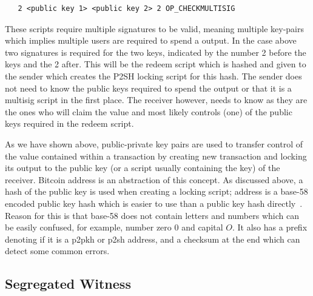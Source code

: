 \begin{verbatim}
   2 <public key 1> <public key 2> 2 OP_CHECKMULTISIG
\end{verbatim}

These scripts require multiple signatures to be valid, meaning multiple key-pairs which implies multiple users are required to spend a output.
In the case above two signatures is required for the two keys, indicated by the number 2 before the keys and the 2 after.
This will be the redeem script which is hashed and given to the sender which creates the P2SH locking script for this hash.
The sender does not need to know the public keys required to spend the output or that it is a multisig script in the first place. The receiver however, needs to know as they are the ones who will claim the value and most likely controls (one) of the public keys required in the redeem script.


As we have shown above, public-private key pairs are used to transfer control of the value contained within a transaction by creating new transaction and locking its output to the public key (or a script usually containing the key) of the receiver. Bitcoin address is an abstraction of this concept. As discussed above, a hash of the public key is used when creating a locking script; address is a base-58 encoded public key hash which is easier to use than a public key hash directly~\cite{antonopoulos2017mastering}. Reason for this is that base-58 does not contain letters and numbers which can be easily confused, for example, number zero $0$ and capital $O$. It also has a prefix denoting if it is a p2pkh or p2sh address, and a checksum at the end which can detect some common errors.

\subsection{Segregated Witness}
\label{subsec:segwit}

